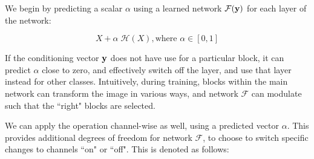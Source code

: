 We begin by predicting a scalar $\alpha$ using a learned network $\mathcal{F}({\bf y})$ for each layer of the network:




\begin{equation}
X + \alpha \; \mathcal{H}(X), \text{where } \alpha \in [0,1]
\end{equation}

If the conditioning vector ${\bf y}$ does not have use for a particular block, it can predict $\alpha$ close to zero, and effectively switch off the layer, and use that layer instead for other classes.
Intuitively, during training, blocks within the main network can transform the image in various ways, and network $\mathcal{F}$ can modulate such that the ``right" blocks are selected.

We can apply the operation channel-wise as well, using a predicted vector {\boldmath$\alpha$}.
This provides additional degrees of freedom for network $\mathcal{F}$, to choose to switch specific changes to channels ``on" or ``off". This is denoted as follows:

